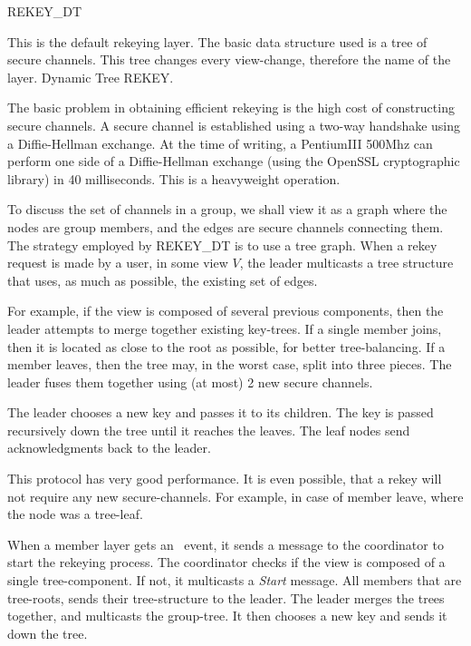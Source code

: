 \begin{Layer}{REKEY\_DT}
\label{layer:rekey_dt}

This is the default rekeying layer. The basic 
data structure used is a tree of secure channels. This tree
changes every view-change, therefore the name of the layer. 
Dynamic Tree REKEY. 

The basic problem in obtaining efficient rekeying is the high cost of
constructing secure channels. A secure channel is established using a
two-way handshake using a Diffie-Hellman exchange.  At the time of
writing, a PentiumIII 500Mhz can perform one side of a Diffie-Hellman
exchange (using the OpenSSL cryptographic library) in 40 milliseconds.
This is a heavyweight operation. 

To discuss the set of channels in a group, we shall view it as a graph
where the nodes are group members, and the edges are secure channels
connecting them. The strategy employed by REKEY\_DT is to use a tree
graph. When a rekey request is made by a user, in some view $V$, the
leader multicasts a tree structure that uses, as much as possible, the
existing set of edges. 

For example, if the view is composed of several previous
components, then the leader attempts to merge together existing
key-trees. If a single member joins, then it is located as close to the
root as possible, for better tree-balancing. If a member leaves, then
the tree may, in the worst case, split into three pieces. The leader
fuses them together using (at most) 2 new secure channels. 

The leader chooses a new key and passes it to its
children. The key is passed recursively down the tree until it reaches
the leaves. The leaf nodes send acknowledgments back to the leader.

This protocol has very good performance. It is even possible, that a
rekey will not require any new secure-channels. For example, in case
of member leave, where the node was a tree-leaf. 

\begin{Protocol}
When a member layer gets an \ERekeyPrcl\ event, it sends a message to the
coordinator to start the rekeying process.  The coordinator checks if
the view is composed of a single tree-component. If not, it multicasts
a {\it Start} message. All members that are tree-roots, sends their
tree-structure to the leader. The leader merges the trees together,
and multicasts the group-tree. It then chooses a new key and sends it
down the tree. 


\end{Protocol}
\end{Layer}
